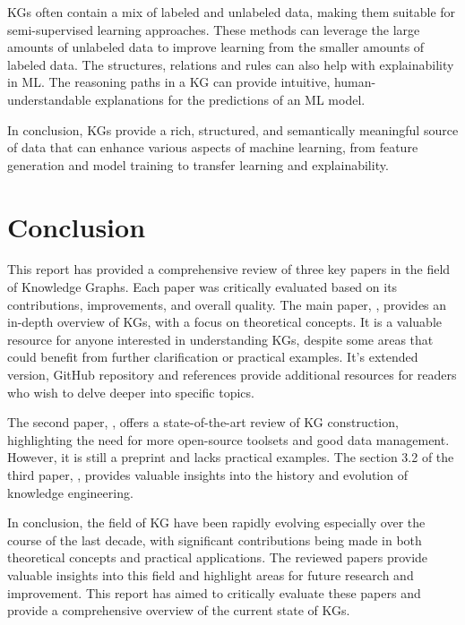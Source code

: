 \documentclass[11pt]{article} %
\begin{document}
KGs often contain a mix of labeled and unlabeled data, making them suitable for semi-supervised learning approaches. These methods can leverage the large amounts of unlabeled data to improve learning from the smaller amounts of labeled data. The structures, relations and rules can also help with explainability in ML. The reasoning paths in a KG can provide intuitive, human-understandable explanations for the predictions of an ML model.

In conclusion, KGs provide a rich, structured, and semantically meaningful source of data that can enhance various aspects of machine learning, from feature generation and model training \cite*{KG21} to transfer learning and explainability.

\section{Conclusion}

This report has provided a comprehensive review of three key papers in the field of Knowledge Graphs. Each paper was critically evaluated based on its contributions, improvements, and overall quality. The main paper,  \cite*{KG21}, provides an in-depth overview of KGs, with a focus on theoretical concepts. It is a valuable resource for anyone interested in understanding KGs, despite some areas that could benefit from further clarification or practical examples. It's extended version, GitHub repository and references provide additional resources for readers who wish to delve deeper into specific topics.

The second paper,  \cite*{CKG23}, offers a state-of-the-art review of KG construction, highlighting the need for more open-source toolsets and good data management. However, it is still a preprint and lacks practical examples. The section 3.2 of the third paper,  \cite*{KGKE22}, provides valuable insights into the history and evolution of knowledge engineering.

In conclusion, the field of KG have been rapidly evolving especially over the course of the last decade, with significant contributions being made in both theoretical concepts and practical applications. The reviewed papers provide valuable insights into this field and highlight areas for future research and improvement. This report has aimed to critically evaluate these papers and provide a comprehensive overview of the current state of KGs.


\end{document}
